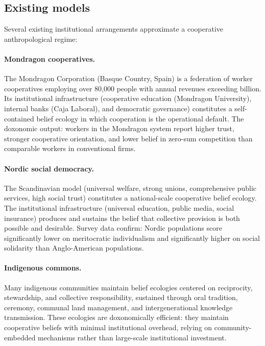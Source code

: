 \subsection{Existing models}

Several existing institutional arrangements approximate a cooperative anthropological regime:

\paragraph{Mondragon cooperatives.}
The Mondragon Corporation (Basque Country, Spain) is a federation of worker cooperatives employing over 80,000 people with annual revenues exceeding  billion.
Its institutional infrastructure (cooperative education (Mondragon University), internal banks (Caja Laboral), and democratic governance) constitutes a self-contained belief ecology in which cooperation is the operational default.
The doxonomic output: workers in the Mondragon system report higher trust, stronger cooperative orientation, and lower belief in zero-sum competition than comparable workers in conventional firms.

\paragraph{Nordic social democracy.}
The Scandinavian model (universal welfare, strong unions, comprehensive public services, high social trust) constitutes a national-scale cooperative belief ecology.
The institutional infrastructure (universal education, public media, social insurance) produces and sustains the belief that collective provision is both possible and desirable.
Survey data confirm: Nordic populations score significantly lower on meritocratic individualism and significantly higher on social solidarity than Anglo-American populations.

\paragraph{Indigenous commons.}
Many indigenous communities maintain belief ecologies centered on reciprocity, stewardship, and collective responsibility, sustained through oral tradition, ceremony, communal land management, and intergenerational knowledge transmission.
These ecologies are doxonomically efficient: they maintain cooperative beliefs with minimal institutional overhead, relying on community-embedded mechanisms rather than large-scale institutional investment.

